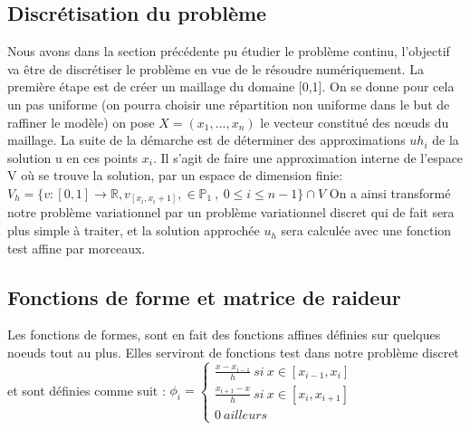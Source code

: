 \documentclass[a4paper,french,10pt]{article}
\begin{document}
\subsection{Discrétisation du problème}
Nous avons dans la section précédente pu étudier le problème continu, l'objectif va être de discrétiser le problème en vue de le résoudre numériquement. La première étape est de créer un maillage du domaine [0,1]. On se donne pour cela un pas uniforme (on pourra choisir une répartition non uniforme dans le but de raffiner le modèle)
\newline\newline on pose $ X=(x_1,...,x_n)$ le vecteur constitué des nœuds du maillage. La suite de la démarche est de déterminer des approximations  $ uh_i $ de la solution u en ces points $ x_i $.
\newline Il s'agit de faire une approximation interne de l'espace V où se trouve la solution, par un espace de dimension finie:
\newline $ V_h=\{ v:[0,1]\longrightarrow \mathds{R} , v_{[x_i,x_i+1]}, \in \mathds{P}_1~,~0 \leq i \leq n-1  \} \cap V $ 
\newline \newline On a ainsi transformé notre problème variationnel par un problème variationnel discret qui de fait sera plus simple à traiter, et la solution approchée $u_h$ sera calculée avec une fonction test affine par morceaux.
\subsection{Fonctions de forme et matrice de raideur }
Les fonctions de formes, sont en fait des fonctions affines définies sur quelques noeuds tout au plus. Elles serviront de fonctions test dans notre problème discret et sont définies comme suit :
\newline\newline
 $ \phi_i= \left\{
\begin{array}{l}
    \frac{x-x_{i-1}}{h}~si~x \in [x_{i-1},x_i] \\
    \frac{x_{i+1}-x}{h}~si~x \in [x_i,x_{i+1}]   \\
    0~ailleurs 
    
\end{array}
\right.$
\end{document}
